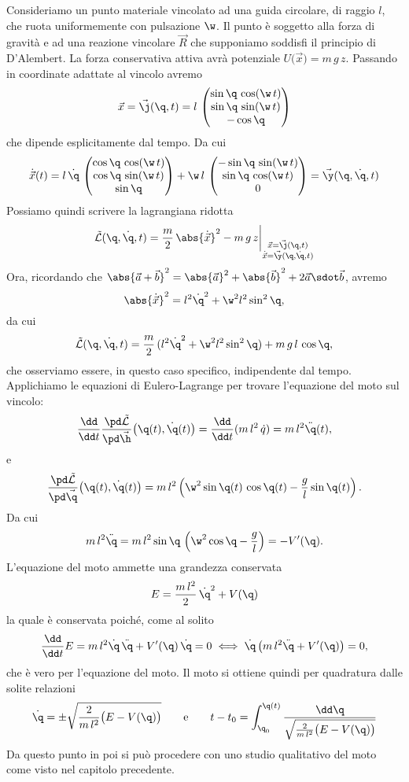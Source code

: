 \begin{ese}
	Consideriamo un punto materiale vincolato ad una guida circolare, di raggio \(l\), che ruota uniformemente con pulsazione \(\w\). Il punto è soggetto alla forza di gravità e ad una reazione vincolare \(\vec{R}\) che supponiamo soddisfi il principio di D'Alembert. La forza conservativa attiva avrà potenziale \(U\big(\vec{x}\big)=m\,g\,z\). Passando in coordinate adattate al vincolo avremo
	\[
		\vec{x} = \vec{\j}(\q,t) = l\, 	\begin{pmatrix}
			\sin\q\,\cos(\w\,t) \\
			\sin\q\,\sin(\w\,t) \\
			-\cos\q
		\end{pmatrix}
	\]
	che dipende esplicitamente dal tempo. Da cui
	\[
		\dot{\vec{x}}(t) = l\,\dot{\q}\, \begin{pmatrix}\cos\q\,\cos(\w\,t)\\\cos\q\,\sin(\w\,t)\\\sin\q\end{pmatrix} + \w\,l\, \begin{pmatrix}-\sin\q\,\sin(\w\,t)\\\sin\q\,\cos(\w\,t)\\0\end{pmatrix} = \vec{\y}(\q,\dot{\q},t)
	\]
	Possiamo quindi scrivere la lagrangiana ridotta
	\[
		\tilde{\mathcal{L}}(\q,\dot{\q},t) = \frac{m}{2}\,\abs{\dot{\vec{x}}}^2-m\,g\,z\bigg|_{\substack{\vec{x}=\vec{\j}(\q,t)\\\dot{\vec{x}}=\vec{\y}(\q,\dot{\q},t)}}
	\]
	Ora, ricordando che \(\abs{\vec{a}+\vec{b}}^2 = \abs{\vec{a}}^2+\abs{\vec{b}}^2+2\vec{a}\sdot\vec{b}\), avremo
	\[
		\abs{\dot{\vec{x}}}^2 = l^2 \dot{\q}^2 + \w^2 l^2 \sin^2\q,
	\]
	da cui
	\[
		\tilde{\mathcal{L}}(\q,\dot{\q},t) = \frac{m}{2}\,( l^2 \dot{\q}^2 + \w^2 l^2 \sin^2\q) + m\,g\,l\,\cos\q,
	\]
	che osserviamo essere, in questo caso specifico, indipendente dal tempo.
	Applichiamo le equazioni di Eulero-Lagrange per trovare l'equazione del moto sul vincolo:
	\[
		\frac{\dd}{\dd t}\frac{\pd\tilde{\mathcal{L}}}{\pd\vec{\h}}\big(\q(t),\dot{\q}(t)\big) = \frac{\dd}{\dd t}(m\,l^2\,\dot{q}) = m\,l^2 \ddot{\q}(t),
	\]
	e
	\[
		\frac{\pd\tilde{\mathcal{L}}}{\pd\vec{\q}}\big(\q(t),\dot{\q}(t)\big) = m\,l^2 \left(\w^2 \sin\q(t)\,\cos\q(t)-\frac{g}{l}\sin\q(t)\right).
	\]
	Da cui
	\[
		m\,l^2 \ddot{\q} = m\,l^2 \sin\q\,\left(\w^2\cos\q- \frac{g}{l}\right) = -V'(\q).
	\]
	L'equazione del moto ammette una grandezza conservata
	\[
		E = \frac{m\,l^2}{2}\,\dot{\q}^2 + V(\q)
	\]
	la quale è conservata poiché, come al solito
	\[
		\frac{\dd}{\dd t}E = m\,l^2 \dot{\q}\,\ddot{\q} + V'(\q)\,\dot{\q} = 0 \iff \dot{\q}\,\big(m\,l^2\ddot{\q}+V'(\q)\big) = 0,
	\]
	che è vero per l'equazione del moto.
	Il moto si ottiene quindi per quadratura dalle solite relazioni
	\[
		\dot{\q} = \pm \sqrt{\frac{2}{m\,l^2}\big(E-V(\q)\big)} \qquad\text{e}\qquad t-t_0 = \int_{\q_0}^{\q(t)} \frac{\dd\q}{\sqrt{\frac{2}{m\,l^2}\big(E-V(\q)\big)}}
	\]
	Da questo punto in poi si può procedere con uno studio qualitativo del moto come visto nel capitolo precedente.
\end{ese}

